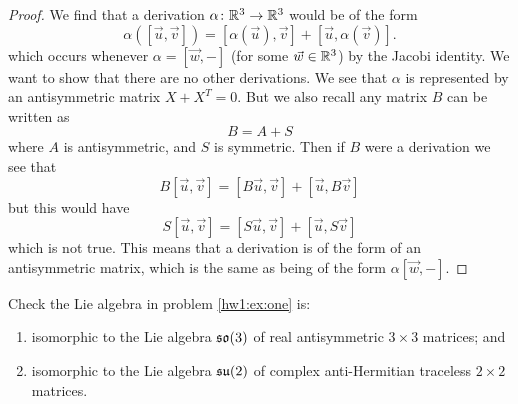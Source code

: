 \begin{proof}
We find that a derivation $\alpha\colon\Bbb{R}^{3}\to\Bbb{R}^{3}$
would be of the form
\begin{equation}
\alpha([\vec{u},\vec{v}])=[\alpha(\vec{u}),\vec{v}]+[\vec{u},\alpha(\vec{v})].
\end{equation}
which occurs whenever $\alpha=[\vec{w},-]$ (for some
$\vec{w}\in\Bbb{R}^{3}$) by the Jacobi identity. We want to show
that there are no other derivations. We see that $\alpha$ is
represented by an antisymmetric matrix $X+X^{T}=0$. But we also
recall any matrix $B$ can be written as
\begin{equation}
B = A + S
\end{equation}
where $A$ is antisymmetric, and $S$ is symmetric. Then if $B$
were a derivation we see that
\begin{equation}
B[\vec{u},\vec{v}]=[B\vec{u},\vec{v}]+[\vec{u},B\vec{v}]
\end{equation}
but this would have
\begin{equation}
S[\vec{u},\vec{v}]=[S\vec{u},\vec{v}]+[\vec{u},S\vec{v}]
\end{equation}
which is not true. This means that a derivation is of the form of
an antisymmetric matrix, which is the same as being of the form $\alpha[\vec{w},-]$.
\end{proof}

\begin{exercise}
Check the Lie algebra in problem \ref{hw1:ex:one} is:
\begin{enumerate}
\item isomorphic to the Lie algebra $\frak{so}(3)$ of real
  antisymmetric $3\times 3$ matrices; and
\item isomorphic to the Lie algebra $\frak{su}(2)$ of complex
  anti-Hermitian traceless $2\times 2$ matrices.
\end{enumerate}
\end{exercise}

